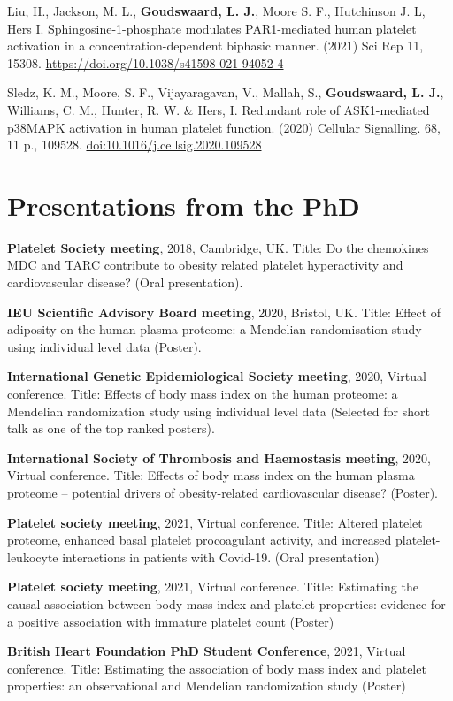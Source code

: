 \documentclass[11pt,twoside]{bristolthesis}
\begin{document}
Liu, H., Jackson, M. L., \textbf{Goudswaard, L. J.}, Moore S. F., Hutchinson J. L, Hers I. Sphingosine-1-phosphate modulates PAR1-mediated human platelet activation in a concentration-dependent biphasic manner. (2021) Sci Rep 11, 15308. \url{https://doi.org/10.1038/s41598-021-94052-4}

Sledz, K. M., Moore, S. F., Vijayaragavan, V., Mallah, S., \textbf{Goudswaard, L. J.}, Williams, C. M., Hunter, R. W. \& Hers, I. Redundant role of ASK1-mediated p38MAPK activation in human platelet function. (2020) Cellular Signalling. 68, 11 p., 109528. \url{doi:10.1016/j.cellsig.2020.109528}

\hypertarget{presentations-from-the-phd}{%
\section{Presentations from the PhD}\label{presentations-from-the-phd}}

\textbf{Platelet Society meeting}, 2018, Cambridge, UK. Title: Do the chemokines MDC and TARC contribute to obesity related platelet hyperactivity and cardiovascular disease? (Oral presentation).

\textbf{IEU Scientific Advisory Board meeting}, 2020, Bristol, UK. Title: Effect of adiposity on the human plasma proteome: a Mendelian randomisation study using individual level data (Poster).

\textbf{International Genetic Epidemiological Society meeting}, 2020, Virtual conference. Title: Effects of body mass index on the human proteome: a Mendelian randomization study using individual level data (Selected for short talk as one of the top ranked posters).

\textbf{International Society of Thrombosis and Haemostasis meeting}, 2020, Virtual conference. Title: Effects of body mass index on the human plasma proteome -- potential drivers of obesity-related cardiovascular disease? (Poster).

\textbf{Platelet society meeting}, 2021, Virtual conference. Title: Altered platelet proteome, enhanced basal platelet procoagulant activity, and increased platelet-leukocyte interactions in patients with Covid-19. (Oral presentation)

\textbf{Platelet society meeting}, 2021, Virtual conference. Title: Estimating the causal association between body mass index and platelet properties: evidence for a positive association with immature platelet count (Poster)

\textbf{British Heart Foundation PhD Student Conference}, 2021, Virtual conference. Title: Estimating the association of body mass index and platelet properties: an observational and Mendelian randomization study (Poster)
\end{document}
